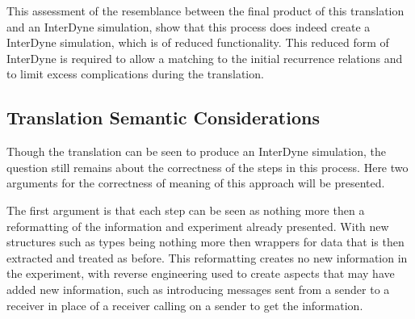 \documentclass{article}
\begin{document}
This assessment of the resemblance between the final product of this translation and an InterDyne simulation, show that this process does indeed create a InterDyne simulation, which is of reduced functionality. This reduced form of InterDyne is required to allow a matching to the initial recurrence relations and to limit excess complications during the translation.



\subsection{Translation Semantic Considerations} %


Though the translation can be seen to produce an InterDyne simulation, the question still remains about the correctness of the steps in this process. Here two arguments for the correctness of meaning of this approach will be presented.  

The first argument is that each step can be seen as nothing more then a reformatting of the information and experiment already presented. With new structures such as types being nothing more then wrappers for data that is then extracted and treated as before. This reformatting creates no new information in the experiment, with reverse engineering used to create aspects that may have added new information, such as introducing messages sent from a sender to a receiver in place of a receiver calling on a sender to get the information.   
\end{document}
